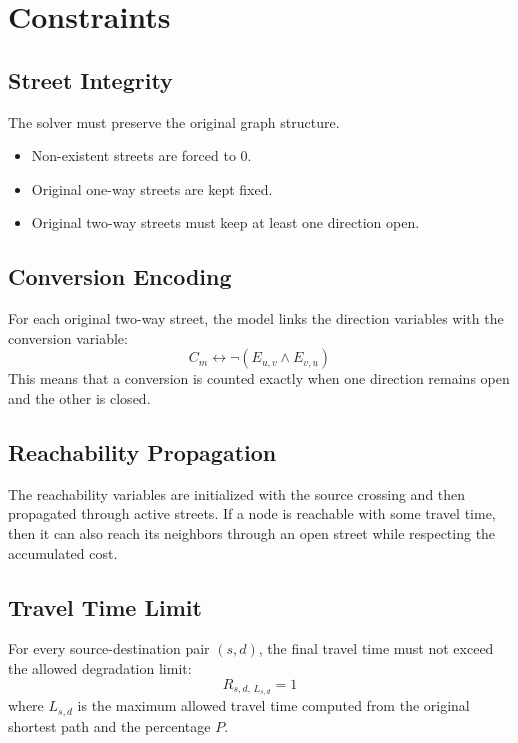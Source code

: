 \section*{Constraints}

\subsection*{Street Integrity}
The solver must preserve the original graph structure.
\begin{itemize}
    \item Non-existent streets are forced to $0$.
    \item Original one-way streets are kept fixed.
    \item Original two-way streets must keep at least one direction open.
\end{itemize}

\subsection*{Conversion Encoding}
For each original two-way street, the model links the direction variables with the conversion variable:
\begin{equation}
    C_m \leftrightarrow \neg(E_{u,v} \wedge E_{v,u})
\end{equation}
This means that a conversion is counted exactly when one direction remains open and the other is closed.

\subsection*{Reachability Propagation}
The reachability variables are initialized with the source crossing and then propagated through active streets.
If a node is reachable with some travel time, then it can also reach its neighbors through an open street while respecting the accumulated cost.

\subsection*{Travel Time Limit}
For every source-destination pair $(s,d)$, the final travel time must not exceed the allowed degradation limit:
\begin{equation}
    R_{s,d,\,L_{s,d}} = 1
\end{equation}
where $L_{s,d}$ is the maximum allowed travel time computed from the original shortest path and the percentage $P$.

